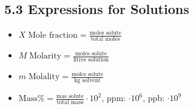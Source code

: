 \subsection{5.3 Expressions for Solutions}
\begin{itemize}
    \item $X \; \textrm{Mole fraction} = \frac{\textrm{moles solute}}{\textrm{total moles}}$
    \item $M \; \textrm{Molarity} = \frac{\textrm{moles solute}}{\textrm{litres solution}}$
    \item $m \; \textrm{Molality} = \frac{\textrm{moles solute}}{\textrm{kg solvent}}$
    \item $\textrm{Mass} \% = \frac{\textrm{mas solute}}{\textrm{total mass}} \cdot 10^2$, ppm: $\cdot 10^6$, ppb: $\cdot 10^9$
\end{itemize}